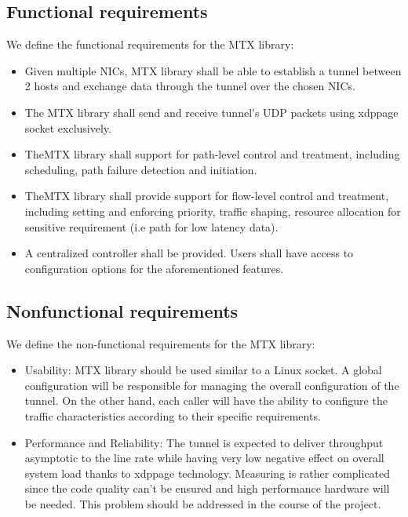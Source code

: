 \subsection{Functional requirements}
We define the functional requirements for the \ac{MTX} library:
\begin{itemize}
    \item Given multiple \ac{NIC}s, \ac{MTX} library shall be able to establish a tunnel between 2 hosts and exchange data through the tunnel over the chosen \ac{NIC}s.
    \item The \ac{MTX} library shall send and receive tunnel's UDP packets using \ac{xdppage} socket exclusively.
    \item The\ac{MTX} library shall support for path-level control and treatment, including scheduling, path failure detection and initiation. 
    \item The\ac{MTX} library shall provide support for flow-level control and treatment, including setting and enforcing priority, traffic shaping, resource allocation for sensitive requirement (i.e path for low latency data).
    \item A centralized controller shall be provided. Users shall have access to configuration options for the aforementioned features.
\end{itemize}

\subsection{Nonfunctional requirements}
We define the non-functional requirements for the \ac{MTX} library:
\begin{itemize}
    \item Usability: \ac{MTX} library should be used similar to a Linux socket. A global configuration will be responsible for managing the overall configuration of the tunnel. On the other hand, each caller will have the ability to configure the traffic characteristics according to their specific requirements.
    \item Performance and Reliability: The tunnel is expected to deliver throughput asymptotic to the line rate while having very low negative effect on overall system load thanks to \ac{xdppage} technology. Measuring is rather complicated since the code quality can't be ensured and high performance hardware will be needed. This problem should be addressed in the course of the project.
\end{itemize}

